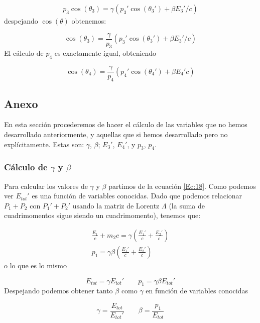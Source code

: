 \begin{eqnarray}
    p_3 \cos (\theta_3) = \gamma (p_3' \cos (\theta_3')+\beta E_3'/c)
\end{eqnarray}
despejando $\cos (\theta)$ obtenemos:

\begin{equation}
    \cos (\theta_3) = \frac{\gamma}{p_3} (p_3' \cos (\theta_3')+\beta E_3'/c)
\end{equation}
El cálculo de $p_4$ es exactamente igual, obteniendo


\begin{equation}
    \cos (\theta_4) = \frac{\gamma}{p_4} (p_4' \cos (\theta_4')+\beta E_4'c)
\end{equation}



\subsection{Anexo}

En esta sección procederemos de hacer el cálculo de las variables que no hemos desarrollado anteriormente, y aquellas que si hemos desarrollado pero no explícitamente. Estas son: $\gamma$, $\beta$; $E_3'$, $E_4'$, y $p_3$, $p_4$.

\subsubsection{Cálculo de $\gamma$ y $\beta$}
Para calcular los valores de $\gamma$ y $\beta$ partimos de la ecuación \ref{Ec:18}. Como podemos ver $E_{tot}'$ es una función de variables conocidas. Dado que podemos relacionar $P_1+P_2$ con $P_1'+P_2'$ usando la matriz de Lorentz $\Lambda$ (la suma de cuadrimomentos sigue siendo un cuadrimomento), tenemos que:

\begin{eqnarray}
    \frac{E_1}{c}+m_2c =  \gamma\left( \frac{E_1'}{c}+ \frac{E_2'}{c}\right)  \\
    p_1 =  \gamma  \beta  \left( \frac{E_1'}{c}+ \frac{E_2'}{c}\right) 
\end{eqnarray}
o lo que es lo mismo

\begin{equation}
    E_{tot} = \gamma E_{tot}' \quad \quad  p_1 = \gamma \beta E_{tot}'
\end{equation}
Despejando podemos obtener tanto $\beta$ como $\gamma$ en función de variables conocidas

\begin{equation}
    \gamma = \frac{E_{tot}}{E_{tot}'} \quad \quad \beta = \frac{p_1}{E_{tot}}
\end{equation}


